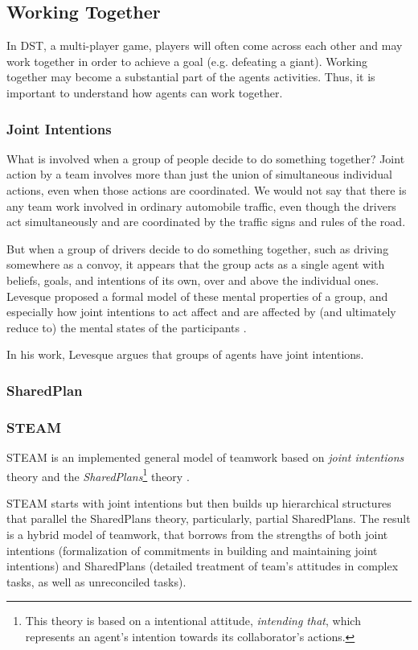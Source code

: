 \subsection{Working Together}
In \ac{DST}, a multi-player game, players will often come across each other and may work together in order to achieve a goal (e.g. defeating a giant).
Working together may become a substantial part of the agents activities.
Thus, it is important to understand how agents can work together.

\subsubsection{Joint Intentions}
What is involved when a group of people decide to do something together?
Joint action by a team involves more than just the union of simultaneous individual actions, even when those actions are coordinated. We would not say that there is any team work involved in ordinary automobile traffic, even though the drivers act simultaneously and are coordinated by the traffic signs and rules of the road.

But when a group of drivers decide to do something together, such as driving somewhere as a convoy, it appears that the group acts as a single agent with beliefs, goals, and intentions of its own, over and above the individual ones.
Levesque proposed a formal model of these mental properties of a group, and especially how joint intentions to act affect and are affected by (and ultimately reduce to) the mental states of the participants \cite{levesque:joint-intention}.

In his work, Levesque argues that groups of agents have joint intentions.

\subsubsection{SharedPlan}

\subsubsection{STEAM}
STEAM is an implemented general model of teamwork based on \textit{joint intentions} theory \cite{levesque:joint-intention} and the \textit{SharedPlans}\footnote{This theory is based on a intentional attitude, \textit{intending that}, which represents an agent's intention towards its collaborator's actions.} theory \cite{grosz:sharedplan}.

STEAM starts with joint intentions but then builds up hierarchical structures that parallel the SharedPlans theory, particularly, partial SharedPlans.
The result is a hybrid model of teamwork, that borrows from the strengths of both joint intentions (formalization of commitments in building and maintaining joint intentions) and SharedPlans (detailed treatment of team's attitudes in complex tasks, as well as unreconciled tasks).